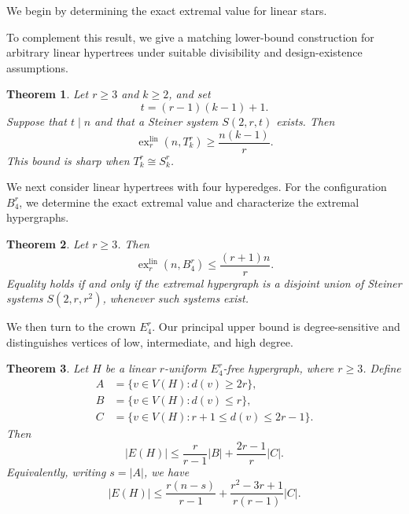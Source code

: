 \documentclass[11pt,a4paper]{article}
\newtheorem{theorem}{Theorem}[section]
\newtheorem{proposition}[theorem]{Proposition}
\theoremstyle{definition}
\theoremstyle{remark}
\begin{document}
We begin by determining the exact extremal value for linear stars.

To complement this result, we give a matching lower-bound construction
for arbitrary linear hypertrees under suitable divisibility and
design-existence assumptions.

\begin{theorem}\label{lowerbound}
Let \(r\geq 3\) and \(k\geq 2\), and set
$$
t=(r-1)(k-1)+1.
$$
Suppose that \(t\mid n\) and that a Steiner system \(S(2,r,t)\) exists.
Then
$$
\operatorname{ex}^{\mathrm{lin}}_r(n,T_k^r)
\geq
\frac{n(k-1)}{r}.
$$
This bound is sharp when \(T_k^r\cong S_k^r\).
\end{theorem}

We next consider linear hypertrees with four hyperedges. For the
configuration \(B_4^r\), we determine the exact extremal value and
characterize the extremal hypergraphs.

\begin{theorem}\label{b4thm}
Let \(r\geq 3\). Then
$$
\operatorname{ex}^{\mathrm{lin}}_r(n,B_4^r)
\leq
\frac{(r+1)n}{r}.
$$
Equality holds if and only if the extremal hypergraph is a disjoint
union of Steiner systems \(S(2,r,r^2)\), whenever such systems exist.
\end{theorem}

We then turn to the crown \(E_4^r\). Our principal upper bound is
degree-sensitive and distinguishes vertices of low, intermediate, and
high degree.

\begin{theorem}\label{crowndeg}
Let \(H\) be a linear \(r\)-uniform \(E_4^r\)-free hypergraph, where
\(r\geq 3\). Define
$$
\begin{aligned}
A&=\{v\in V(H):d(v)\geq 2r\},\\
B&=\{v\in V(H):d(v)\leq r\},\\
C&=\{v\in V(H):r+1\leq d(v)\leq 2r-1\}.
\end{aligned}
$$
Then
$$
|E(H)|
\leq
\frac{r}{r-1}|B|
+
\frac{2r-1}{r}|C|.
$$
Equivalently, writing \(s=|A|\), we have
$$
|E(H)|
\leq
\frac{r(n-s)}{r-1}
+
\frac{r^2-3r+1}{r(r-1)}|C|.
$$
\end{theorem}
\end{document}
